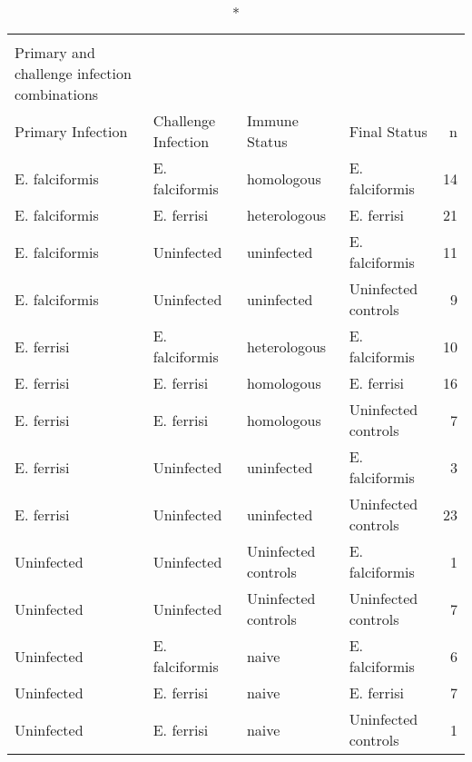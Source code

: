 \begin{longtable}{llllr}
\caption*{
{\large Infection history and immunization status} \\ 
{\small Primary and challenge infection combinations}
} \\ 
\toprule
Primary Infection & Challenge Infection & Immune Status & Final Status & n \\ 
\midrule\addlinespace[2.5pt]
E. falciformis & E. falciformis & homologous & E. falciformis & 14 \\ 
E. falciformis & E. ferrisi & heterologous & E. ferrisi & 21 \\ 
E. falciformis & Uninfected & uninfected & E. falciformis & 11 \\ 
E. falciformis & Uninfected & uninfected & Uninfected controls & 9 \\ 
E. ferrisi & E. falciformis & heterologous & E. falciformis & 10 \\ 
E. ferrisi & E. ferrisi & homologous & E. ferrisi & 16 \\ 
E. ferrisi & E. ferrisi & homologous & Uninfected controls & 7 \\ 
E. ferrisi & Uninfected & uninfected & E. falciformis & 3 \\ 
E. ferrisi & Uninfected & uninfected & Uninfected controls & 23 \\ 
Uninfected & Uninfected & Uninfected controls & E. falciformis & 1 \\ 
Uninfected & Uninfected & Uninfected controls & Uninfected controls & 7 \\ 
Uninfected & E. falciformis & naive & E. falciformis & 6 \\ 
Uninfected & E. ferrisi & naive & E. ferrisi & 7 \\ 
Uninfected & E. ferrisi & naive & Uninfected controls & 1 \\ 
\bottomrule
\end{longtable}

